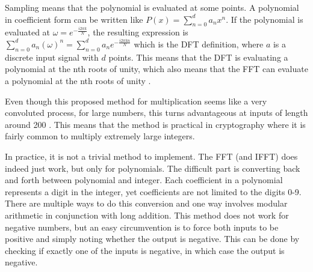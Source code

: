 Sampling means that the polynomial is evaluated at some points. A polynomial in coefficient form can be written like $P(x) = \sum^d_{n=0} a_nx^n$. If the polynomial is evaluated at $\omega = e^{-\frac{i2\pi k}{N}}$, the resulting expression is $\sum^d_{n=0} a_n(\omega)^n = \sum^d_{n=0} a_ne^{-\frac{i2\pi k n}{N}}$ which is the DFT definition, where $a$ is a discrete input signal with $d$ points. This means that the DFT is evaluating a polynomial at the nth roots of unity, which also means that the FFT can evaluate a polynomial at the nth roots of unity \cite{Emerencia2007}.

Even though this proposed method for multiplication seems like a very convoluted process, for large numbers, this turns advantageous at inputs of length around 200 \cite{Emerencia2007}. This means that the method is practical in cryptography where it is fairly common to multiply extremely large integers. 

In practice, it is not a trivial method to implement. The FFT (and IFFT) does indeed just work, but only for polynomials. The difficult part is converting back and forth between polynomial and integer. Each coefficient in a polynomial represents a digit in the integer, yet coefficients are not limited to the digits 0-9. There are multiple ways to do this conversion and one way involves modular arithmetic in conjunction with long addition. This method does not work for negative numbers, but an easy circumvention is to force both inputs to be positive and simply noting whether the output is negative. This can be done by checking if exactly one of the inputs is negative, in which case the output is negative.





